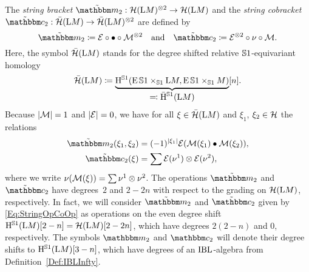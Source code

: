\documentclass[\MainFolder/Text.tex]{subfiles}
\begin{document}
The \emph{string bracket} $\tilde{\StringOp}_2: \GeomStringH(\Loop M)^{\otimes 2}\rightarrow \GeomStringH(\Loop M)$ and the \emph{string cobracket} $\tilde{\StringCoOp}_2: \ConstRedGeomStringH(\Loop M) \rightarrow \ConstRedGeomStringH(\Loop M)^{\otimes 2}$ are defined by
$$ \tilde{\StringOp}_2 \coloneqq \Erase \circ \LoopPr \circ \Mark^{\otimes 2}\quad\text{and}\quad\tilde{\StringCoOp}_2 \coloneqq \Erase^{\otimes 2} \circ \nu \circ \Mark. $$
Here, the symbol $\bar{\mathcal{H}}(\mathrm{L} M)$ stands for the degree shifted relative $\mathbb{S}{1}$-equivariant homology
$$ \bar{\mathcal{H}}(\mathrm{L} M) \coloneqq \underbrace{\mathrm{H}^{\mathbb{S}{1}}(\operatorname{E} \mathbb{S}{1} \times_{\mathbb{S}{1}} \mathrm{L} M, \operatorname{E} \mathbb{S}{1} \times_{\mathbb{S}{1}} M)}_{\displaystyle \eqqcolon \bar{\mathrm{H}}^{\mathbb{S}{1}}(\mathrm{L} M)}[n]. $$
Because $|\mathcal{M}| = 1$ and $|\mathcal{E}| = 0$, we have for all $\xi \in \bar{\mathcal{H}}(\mathrm{L} M)$ and $\xi_1$, $\xi_2 \in \mathcal{H}$ the relations
\begin{equation}\label{Eq:StringOpCoOp}
\begin{aligned}
\tilde{\StringOp}_2(\xi_1,\xi_2) &= (-1)^{\Abs{\xi_1}} \Erase(\Mark(\xi_1)\LoopPr\Mark(\xi_2)), \\
\tilde{\StringCoOp}_2(\xi) & = \sum \Erase(\nu^{1}) \otimes \Erase(\nu^2),
\end{aligned}
\end{equation}
where we write $\nu(\mathcal{M}(\xi)) = \sum \nu^1 \otimes \nu^2$. The operations $\tilde{\StringOp}_2$ and $\tilde{\StringCoOp}_2$ have degrees~$2$ and $2-2n$ with respect to the grading on $\mathcal{H}(\mathrm{L} M)$, respectively. In fact, we will consider $\tilde{\StringOp}_2$ and $\tilde{\StringCoOp}_2$ given by \eqref{Eq:StringOpCoOp} as operations on the even degree shift $\mathrm{H}^{\mathbb{S}{1}}(\mathrm{L} M)[2-n] = \mathcal{H}(\mathrm{L} M)[2-2n]$, which have degrees $2(2-n)$ and $0$, respectively. The symbols $\StringOp_2$ and $\StringCoOp_2$ will denote their degree shifts to $\mathrm{H}^{\mathbb{S}{1}}(\mathrm{L} M)[3-n]$, which have degrees of an $\mathrm{IBL}$-algebra from Definition~\ref{Def:IBLInfty}.
%
\end{document}

